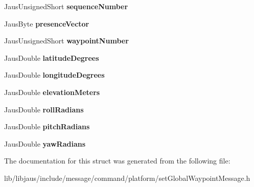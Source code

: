 \begin{DoxyCompactItemize}
\item 
\hypertarget{struct_set_global_waypoint_message_struct_af76e696c762c1c0ba6a073ab3b1aee1b}{\-Jaus\-Unsigned\-Short {\bfseries sequence\-Number}}\label{struct_set_global_waypoint_message_struct_af76e696c762c1c0ba6a073ab3b1aee1b}

\item 
\hypertarget{struct_set_global_waypoint_message_struct_a0ba9157509a1680aaaaf2fe62a96bfe4}{\-Jaus\-Byte {\bfseries presence\-Vector}}\label{struct_set_global_waypoint_message_struct_a0ba9157509a1680aaaaf2fe62a96bfe4}

\item 
\hypertarget{struct_set_global_waypoint_message_struct_ac02d89e7693c96989a21c8d38dda2a40}{\-Jaus\-Unsigned\-Short {\bfseries waypoint\-Number}}\label{struct_set_global_waypoint_message_struct_ac02d89e7693c96989a21c8d38dda2a40}

\item 
\hypertarget{struct_set_global_waypoint_message_struct_a2599d33717334c0ee010a1654ccfdbc4}{\-Jaus\-Double {\bfseries latitude\-Degrees}}\label{struct_set_global_waypoint_message_struct_a2599d33717334c0ee010a1654ccfdbc4}

\item 
\hypertarget{struct_set_global_waypoint_message_struct_ac9f22bffd8fb8fb25bd75d5088af4b6c}{\-Jaus\-Double {\bfseries longitude\-Degrees}}\label{struct_set_global_waypoint_message_struct_ac9f22bffd8fb8fb25bd75d5088af4b6c}

\item 
\hypertarget{struct_set_global_waypoint_message_struct_a60e57a36374c07121adffbc64678a01f}{\-Jaus\-Double {\bfseries elevation\-Meters}}\label{struct_set_global_waypoint_message_struct_a60e57a36374c07121adffbc64678a01f}

\item 
\hypertarget{struct_set_global_waypoint_message_struct_a8e8d4a068159d24a41b2bb468215eafd}{\-Jaus\-Double {\bfseries roll\-Radians}}\label{struct_set_global_waypoint_message_struct_a8e8d4a068159d24a41b2bb468215eafd}

\item 
\hypertarget{struct_set_global_waypoint_message_struct_a8213ac3d5e6af891266af22a945d6d89}{\-Jaus\-Double {\bfseries pitch\-Radians}}\label{struct_set_global_waypoint_message_struct_a8213ac3d5e6af891266af22a945d6d89}

\item 
\hypertarget{struct_set_global_waypoint_message_struct_a3381c437391499e6a2a8e405357fe026}{\-Jaus\-Double {\bfseries yaw\-Radians}}\label{struct_set_global_waypoint_message_struct_a3381c437391499e6a2a8e405357fe026}

\end{DoxyCompactItemize}


\-The documentation for this struct was generated from the following file\-:\begin{DoxyCompactItemize}
\item 
lib/libjaus/include/message/command/platform/set\-Global\-Waypoint\-Message.\-h\end{DoxyCompactItemize}
